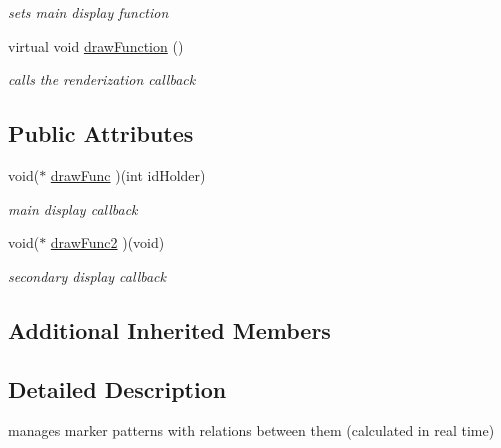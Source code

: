 \begin{DoxyCompactItemize}
\begin{DoxyCompactList}\small\item\em sets main display function \end{DoxyCompactList}\item 
\hypertarget{classavr_system_auto_multi_a030a805955fcc90a8082fcb12ad9a80f}{virtual void \hyperlink{classavr_system_auto_multi_a030a805955fcc90a8082fcb12ad9a80f}{draw\-Function} ()}\label{classavr_system_auto_multi_a030a805955fcc90a8082fcb12ad9a80f}

\begin{DoxyCompactList}\small\item\em calls the renderization callback \end{DoxyCompactList}\end{DoxyCompactItemize}
\subsection*{Public Attributes}
\begin{DoxyCompactItemize}
\item 
\hypertarget{classavr_system_auto_multi_a3bd075f84c739fc5778a46e6146b874e}{void($\ast$ \hyperlink{classavr_system_auto_multi_a3bd075f84c739fc5778a46e6146b874e}{draw\-Func} )(int id\-Holder)}\label{classavr_system_auto_multi_a3bd075f84c739fc5778a46e6146b874e}

\begin{DoxyCompactList}\small\item\em main display callback \end{DoxyCompactList}\item 
\hypertarget{classavr_system_auto_multi_a374678038af70f4436d7f45947d3cb76}{void($\ast$ \hyperlink{classavr_system_auto_multi_a374678038af70f4436d7f45947d3cb76}{draw\-Func2} )(void)}\label{classavr_system_auto_multi_a374678038af70f4436d7f45947d3cb76}

\begin{DoxyCompactList}\small\item\em secondary display callback \end{DoxyCompactList}\end{DoxyCompactItemize}
\subsection*{Additional Inherited Members}


\subsection{Detailed Description}
manages marker patterns with relations between them (calculated in real time) 


